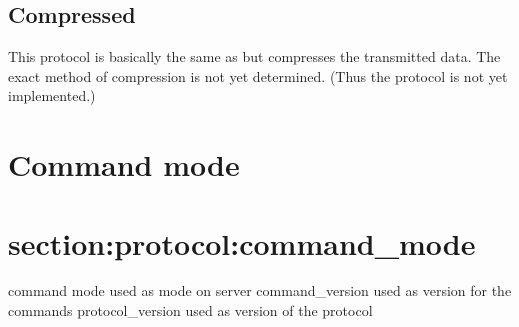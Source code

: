 \subsection{Compressed}
\label{protocol:compressed}

This protocol is basically the same as  but
compresses the transmitted data. The exact method of compression is not yet
determined. (Thus the protocol is not yet implemented.)

\section{Command mode}
\section{section:protocol:command\_mode}

command mode used as mode on server
command\_version used as version for the commands
protocol\_version used as version of the protocol


